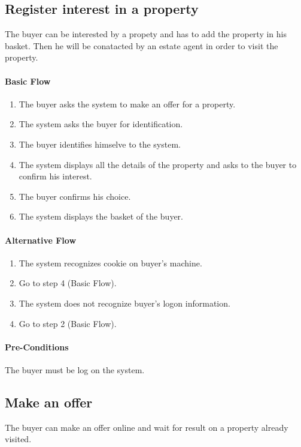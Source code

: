 \documentclass[a4paper,12pt]{article}
\begin{document}
\subsection{Register interest in a property}
The buyer can be interested by a propety and has to add the property in his basket. Then he will be conatacted by an estate agent in order to visit the property.
\paragraph{Basic Flow}
\begin{enumerate}
\item The buyer asks the system to make an offer for a property.
\item The system asks the buyer for identification.
\item The buyer identifies himselve to the system.
\item The system displays all the details of the property and asks to the buyer to confirm his interest.
\item The buyer confirms his choice.
\item The system displays the basket of the buyer.
\end{enumerate}
\paragraph{Alternative Flow}
\begin{enumerate}
\item The system recognizes cookie on buyer's machine. 
\item Go to step 4 (Basic Flow).
\item The system does not recognize buyer's logon information.
\item Go to step 2 (Basic Flow).
\end{enumerate}
\paragraph{Pre-Conditions}
The buyer must be log on the system.

\subsection{Make an offer}
The buyer can make an offer online and wait for result on a property already visited.
\end{document}
